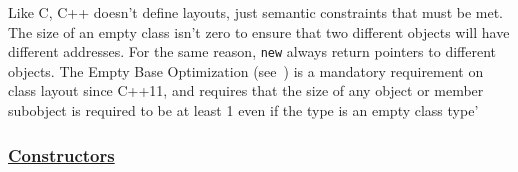 Like C, C++ doesn’t define layouts, just semantic constraints that must 
be met.
\newline
The size of an empty class isn't zero to ensure that two different objects 
will have different addresses. For the same reason, \texttt{new} always 
return pointers to different objects.
\newline
The Empty Base Optimization (see~\cite{cppreference-ebo}) is a mandatory 
requirement on class layout since C++11, and requires that the size of any 
object or member subobject is required to be at least 1 even if the type 
is an empty class type'

\subsubsection{\href{https://isocpp.org/wiki/faq/ctors}{\textbf{Constructors}}}
\label{subsubsec:constructors}

